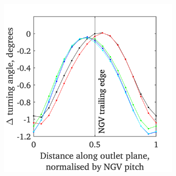 \documentclass[a4paper, 11pt, oneside]{report}
\begin{document}
\begin{figure}[H]
	\centering
	\begin{subfigure}{.45\textwidth}
		\centering
		\includegraphics[width=\linewidth]{figs/ps_cutbacks_turning_angle_surveys.png}
	\end{subfigure}
	\begin{subfigure}{.1125\textwidth}
		\centering

\end{subfigure}
\end{figure}
\end{document}

